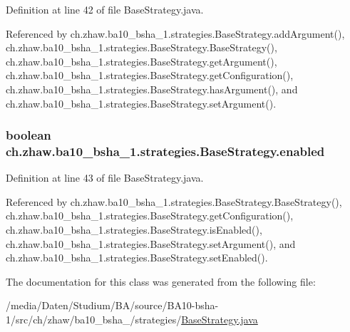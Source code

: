 Definition at line 42 of file BaseStrategy.java.

Referenced by ch.zhaw.ba10\_\-bsha\_\-1.strategies.BaseStrategy.addArgument(), ch.zhaw.ba10\_\-bsha\_\-1.strategies.BaseStrategy.BaseStrategy(), ch.zhaw.ba10\_\-bsha\_\-1.strategies.BaseStrategy.getArgument(), ch.zhaw.ba10\_\-bsha\_\-1.strategies.BaseStrategy.getConfiguration(), ch.zhaw.ba10\_\-bsha\_\-1.strategies.BaseStrategy.hasArgument(), and ch.zhaw.ba10\_\-bsha\_\-1.strategies.BaseStrategy.setArgument().\hypertarget{classch_1_1zhaw_1_1ba10__bsha__1_1_1strategies_1_1BaseStrategy_a5799e7f094efcf8d18d8788e9c911787}{
\subsubsection[{enabled}]{\setlength{\rightskip}{0pt plus 5cm}boolean {\bf ch.zhaw.ba10\_\-bsha\_\-1.strategies.BaseStrategy.enabled}}}
\label{classch_1_1zhaw_1_1ba10__bsha__1_1_1strategies_1_1BaseStrategy_a5799e7f094efcf8d18d8788e9c911787}


Definition at line 43 of file BaseStrategy.java.

Referenced by ch.zhaw.ba10\_\-bsha\_\-1.strategies.BaseStrategy.BaseStrategy(), ch.zhaw.ba10\_\-bsha\_\-1.strategies.BaseStrategy.getConfiguration(), ch.zhaw.ba10\_\-bsha\_\-1.strategies.BaseStrategy.isEnabled(), ch.zhaw.ba10\_\-bsha\_\-1.strategies.BaseStrategy.setArgument(), and ch.zhaw.ba10\_\-bsha\_\-1.strategies.BaseStrategy.setEnabled().

The documentation for this class was generated from the following file:\begin{DoxyCompactItemize}
\item 
/media/Daten/Studium/BA/source/BA10-\/bsha-\/1/src/ch/zhaw/ba10\_\-bsha\_/strategies/\hyperlink{BaseStrategy_8java}{BaseStrategy.java}\end{DoxyCompactItemize}
